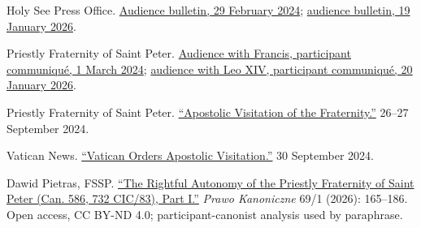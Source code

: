 Holy See Press Office. \href{https://press.vatican.va/content/salastampa/en/bollettino/pubblico/2024/02/29/240229a.html}{Audience bulletin, 29 February 2024}; \href{https://press.vatican.va/content/salastampa/en/bollettino/pubblico/2026/01/19/260119b.html}{audience bulletin, 19 January 2026}.

Priestly Fraternity of Saint Peter. \href{https://www.fssp.org/en/audience-with-pope-francis/}{Audience with Francis, participant communiqué, 1 March 2024}; \href{https://www.fssp.org/en/audience-with-pope-leo-xiv/}{audience with Leo XIV, participant communiqué, 20 January 2026}.

Priestly Fraternity of Saint Peter. \href{https://www.fssp.org/en/apostolic-visitation-of-the-fraternity/}{``Apostolic Visitation of the Fraternity.''} 26--27 September 2024.

Vatican News. \href{https://www.vaticannews.va/en/vatican-city/news/2024-09/vatican-orders-apostolic-visitation-to-fraternity-of-st-peter.html}{``Vatican Orders Apostolic Visitation.''} 30 September 2024.

Dawid Pietras, FSSP. \href{https://doi.org/10.21697/pk.2026.69.1.07}{``The Rightful Autonomy of the Priestly Fraternity of Saint Peter (Can. 586, 732 CIC/83), Part I.''} \emph{Prawo Kanoniczne} 69/1 (2026): 165--186. Open access, CC BY-ND 4.0; participant-canonist analysis used by paraphrase.
